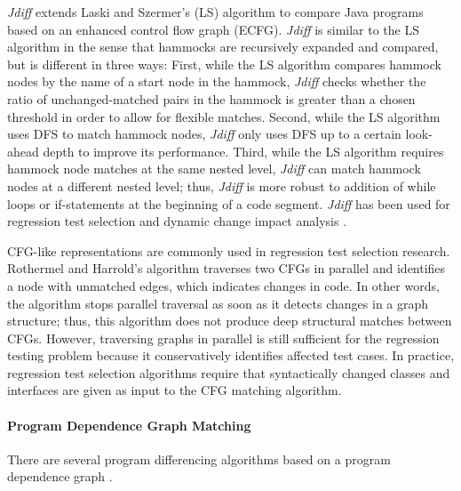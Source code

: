 \documentclass[runningheads,a4paper]{llncs}
\begin{document}
\textit{Jdiff} \cite{Apiwattanapong2004} extends Laski and Szermer's (LS) algorithm to compare Java programs based on an enhanced control flow graph (ECFG). 
\textit{Jdiff} is similar to the LS algorithm in the sense that hammocks are recursively expanded and compared, but is different in three ways: 
First, while the LS algorithm compares hammock nodes by the name of a start node in the hammock, \textit{Jdiff} checks whether the ratio of unchanged-matched pairs in the hammock is greater than a chosen threshold in order to allow for flexible matches.
Second, while the LS algorithm uses DFS to match hammock nodes, \textit{Jdiff} only uses DFS up to a certain look-ahead depth to improve its performance. 
Third, while the LS algorithm requires hammock node matches at the same nested level, \textit{Jdiff} can match hammock nodes at a different nested level; thus, \textit{Jdiff} is more robust to addition of while loops or if-statements at the beginning of a code segment. \textit{Jdiff} has been used for regression test selection \cite{Orso2004} and dynamic change impact analysis \cite{Apiwattanapong2005}. 

CFG-like representations are commonly used in regression test selection research. Rothermel and Harrold's algorithm \cite{Rothermel1997} traverses two CFGs in parallel and identifies a node with unmatched edges, which indicates changes in code. In other words, the algorithm stops parallel traversal as soon as it detects changes in a graph structure; thus, this algorithm does not produce deep structural matches between CFGs. However, traversing graphs in parallel is still sufficient for the regression testing problem because it conservatively identifies affected test cases. In practice, regression test selection algorithms \cite{Harrold2001, Orso2004} require that syntactically changed classes and interfaces are given as input to the CFG matching algorithm. 

\paragraph{Program Dependence Graph Matching}
There are several program differencing algorithms based on a program dependence graph \cite{Horwitz1990, Binkley1995, Jackson1994}. 
\end{document}

